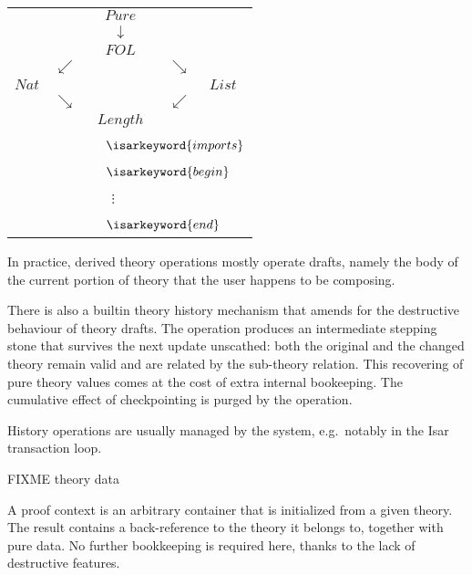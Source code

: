 \begin{isabellebody}
\begin{isamarkuptext}
  \bigskip
  \begin{tabular}{rcccl}
        &            & $Pure$ \\
        &            & $\downarrow$ \\
        &            & $FOL$ \\
        & $\swarrow$ &              & $\searrow$ & \\
  $Nat$ &            &              &            & $List$ \\
        & $\searrow$ &              & $\swarrow$ \\
        &            & $Length$ \\
        &            & \multicolumn{3}{l}{~~$\isarkeyword{imports}$} \\
        &            & \multicolumn{3}{l}{~~$\isarkeyword{begin}$} \\
        &            & $\vdots$~~ \\
        &            & \multicolumn{3}{l}{~~$\isarkeyword{end}$} \\
  \end{tabular}

  \medskip In practice, derived theory operations mostly operate
  drafts, namely the body of the current portion of theory that the
  user happens to be composing.

 \medskip There is also a builtin theory history mechanism that amends for
  the destructive behaviour of theory drafts.  The  operation produces an intermediate stepping stone that
  survives the next update unscathed: both the original and the
  changed theory remain valid and are related by the sub-theory
  relation.  This recovering of pure theory values comes at the cost
  of extra internal bookeeping.  The cumulative effect of
  checkpointing is purged by the  operation.

  History operations are usually managed by the system, e.g.\ notably
  in the Isar transaction loop.

  \medskip
  FIXME theory data%
\end{isamarkuptext}%
\isamarkuptrue%
%
\isamarkuptrue%
%
\begin{isamarkuptext}%
A proof context is an arbitrary container that is initialized from a
  given theory.  The result contains a back-reference to the theory it
  belongs to, together with pure data.  No further bookkeeping is
  required here, thanks to the lack of destructive features.


\end{isamarkuptext}
\end{isabellebody}
